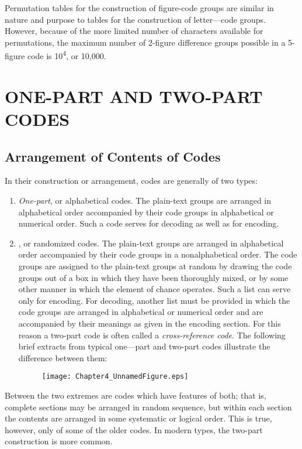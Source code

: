 \mypara Permutation tables for the construction of ﬁgure-code groups are
similar in nature and purpose to tables for the construction of letter—code
groups. However, because of the more limited number of characters
available for permutations, the maximum number of 2-ﬁgure difference
groups possible in a 5-ﬁgure code is 10\textsuperscript{4}, or 10,000.

\section{ONE-PART AND TWO-PART CODES}

\subsection{Arrangement of Contents of Codes}
\mypara In their construction or arrangement, codes are generally of two
types:
\begin{enumerate}
        \item \textit{One-part}, or alphabetical codes. The plain-text groups are
arranged in alphabetical order accompanied by their code groups
in alphabetical or numerical order. Such a code serves for
decoding as well as for encoding.

\item  {}, or randomized codes. The plain-text groups are
arranged in alphabetical order accompanied by their code groups
in a nonalphabetical order. The code groups are assigned to
the plain-text groups at random by drawing the code groups out
of a box in which they have been thoroughly mixed, or by
some other manner in which the element of chance operates.
Such a list can serve only for encoding. For decoding, another
list must be provided in which the code groups are arranged
in alphabetical or numerical order and are accompanied by their
meanings as given in the encoding section. For this reason a
                two-part code is often called a \textit{cross-reference code}. The following brief extracts from typical one—part and two-part codes
illustrate the difference between them:

                \begin{figure}[h]
                        \centering
                        \texttt{[image: Chapter4\_UnnamedFigure.eps]}
                \end{figure}
 

\end{enumerate}
\mypara Between the two extremes are codes which have features of both;
that is, complete sections may be arranged in random sequence, but
within each section the contents are arranged in some systematic or
logical order. This is true, however, only of some of the older codes. In
modern types, the two-part construction is more common.



